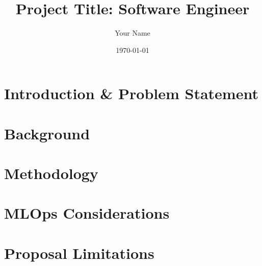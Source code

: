 \documentclass{article}
\title{Project Title: Software Engineer}
\author{Your Name}
\date{\today}
\begin{document}
\maketitle

\section*{Introduction \& Problem Statement}

\section*{Background}

\section*{Methodology}

\section*{MLOps Considerations}

\section*{Proposal Limitations}
\end{document}
